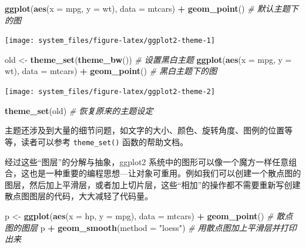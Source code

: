 \documentclass[
  b5paper,
  UTF8,twoside]{book}
\newenvironment{Shaded}{\begin{snugshade}}{\end{snugshade}}
\newcommand{\AttributeTok}[1]{\textcolor[rgb]{0.13,0.29,0.53}{#1}}
\newcommand{\CommentTok}[1]{\textcolor[rgb]{0.56,0.35,0.01}{\textit{#1}}}
\newcommand{\FunctionTok}[1]{\textcolor[rgb]{0.13,0.29,0.53}{\textbf{#1}}}
\newcommand{\NormalTok}[1]{#1}
\newcommand{\OtherTok}[1]{\textcolor[rgb]{0.56,0.35,0.01}{#1}}
\newcommand{\SpecialCharTok}[1]{\textcolor[rgb]{0.81,0.36,0.00}{\textbf{#1}}}
\newcommand{\StringTok}[1]{\textcolor[rgb]{0.31,0.60,0.02}{#1}}
\begin{document}
\begin{Shaded}
\begin{Highlighting}[]
\FunctionTok{ggplot}\NormalTok{(}\FunctionTok{aes}\NormalTok{(}\AttributeTok{x =}\NormalTok{ mpg, }\AttributeTok{y =}\NormalTok{ wt), }\AttributeTok{data =}\NormalTok{ mtcars) }\SpecialCharTok{+}
  \FunctionTok{geom\_point}\NormalTok{() }\CommentTok{\# 默认主题下的图}
\end{Highlighting}
\end{Shaded}

\begin{center}\texttt{[image: system\_files/figure-latex/ggplot2-theme-1]} \end{center}

\begin{Shaded}
\begin{Highlighting}[]
\NormalTok{old }\OtherTok{\textless{}{-}} \FunctionTok{theme\_set}\NormalTok{(}\FunctionTok{theme\_bw}\NormalTok{()) }\CommentTok{\# 设置黑白主题}
\FunctionTok{ggplot}\NormalTok{(}\FunctionTok{aes}\NormalTok{(}\AttributeTok{x =}\NormalTok{ mpg, }\AttributeTok{y =}\NormalTok{ wt), }\AttributeTok{data =}\NormalTok{ mtcars) }\SpecialCharTok{+}
  \FunctionTok{geom\_point}\NormalTok{() }\CommentTok{\# 黑白主题下的图}
\end{Highlighting}
\end{Shaded}

\begin{center}\texttt{[image: system\_files/figure-latex/ggplot2-theme-2]} \end{center}

\begin{Shaded}
\begin{Highlighting}[]
\FunctionTok{theme\_set}\NormalTok{(old) }\CommentTok{\# 恢复原来的主题设定}
\end{Highlighting}
\end{Shaded}

主题还涉及到大量的细节问题，如文字的大小、颜色、旋转角度、图例的位置等等，读者可以参考 \texttt{theme\_set()} 函数的帮助文档。

经过这些``图层''的分解与抽象，ggplot2 系统中的图形可以像一个魔方一样任意组合，这也是一种重要的编程思想---让对象可重用。例如我们可以创建一个散点图的图层，然后加上平滑层，或者加上切片层，这些``相加''的操作都不需要重新写创建散点图图层的代码，大大减轻了代码量。

\begin{Shaded}
\begin{Highlighting}[]
\NormalTok{p }\OtherTok{\textless{}{-}} \FunctionTok{ggplot}\NormalTok{(}\FunctionTok{aes}\NormalTok{(}\AttributeTok{x =}\NormalTok{ hp, }\AttributeTok{y =}\NormalTok{ mpg), }\AttributeTok{data =}\NormalTok{ mtcars) }\SpecialCharTok{+}
  \FunctionTok{geom\_point}\NormalTok{() }\CommentTok{\# 散点图的图层}
\NormalTok{p }\SpecialCharTok{+} \FunctionTok{geom\_smooth}\NormalTok{(}\AttributeTok{method =} \StringTok{"loess"}\NormalTok{) }\CommentTok{\# 用散点图加上平滑层并打印出来}
\end{Highlighting}
\end{Shaded}
\end{document}
